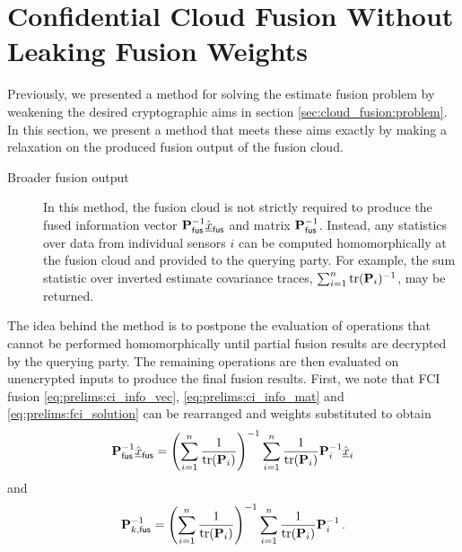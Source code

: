 \section{Confidential Cloud Fusion Without Leaking Fusion Weights}\label{sec:cloud_fusion:secfci2}
Previously, we presented a method for solving the estimate fusion problem by weakening the desired cryptographic aims in section \ref{sec:cloud_fusion:problem}. In this section, we present a method that meets these aims exactly by making a relaxation on the produced fusion output of the fusion cloud.
\begin{description}
    \item[Broader fusion output] In this method, the fusion cloud is not strictly required to produce the fused information vector ${{\mathbf{P}}}_{\mathsf{fus}}^{-1}\hat{{\underline{x}}}_{\mathsf{fus}}$ and matrix ${{\mathbf{P}}}_{\mathsf{fus}}^{-1}$. Instead, any statistics over data from individual sensors $i$ can be computed homomorphically at the fusion cloud and provided to the querying party. For example, the sum statistic over inverted estimate covariance traces, $\sum_{i=1}^n \operatorname{tr}({{\mathbf{P}}}_i)^{-1}$, may be returned.
\end{description}

The idea behind the method is to postpone the evaluation of operations that cannot be performed homomorphically until partial fusion results are decrypted by the querying party. The remaining operations are then evaluated on unencrypted inputs to produce the final fusion results. First, we note that FCI fusion \eqref{eq:prelims:ci_info_vec}, \eqref{eq:prelims:ci_info_mat} and \eqref{eq:prelims:fci_solution} can be rearranged and weights substituted to obtain
\begin{equation}\label{eq:cloud_fusion:secfci2_info_vec_rearrange}
    {\ensuremath{{\mathbf{P}}}}_{\mathsf{fus}}^{-1}\hat{{\underline{x}}}_{\mathsf{fus}} = \left(\sum_{i=1}^n \frac{1}{\operatorname{tr}({{\mathbf{P}}}_i)}\right)^{-1}\sum_{i=1}^n\frac{1}{\operatorname{tr}({{\mathbf{P}}}_i)}{{\mathbf{P}}}_i^{-1}\hat{{\underline{x}}}_i
\end{equation}
and
\begin{equation}\label{eq:cloud_fusion:secfci2_info_mat_rearrange}
    {\ensuremath{{\mathbf{P}}}}_{k,\mathsf{fus}}^{-1} = \left(\sum_{i=1}^n \frac{1}{\operatorname{tr}({{\mathbf{P}}}_i)}\right)^{-1}\sum_{i=1}^n \frac{1}{\operatorname{tr}({{\mathbf{P}}}_i)}{{\mathbf{P}}}_i^{-1}\,.
\end{equation}

